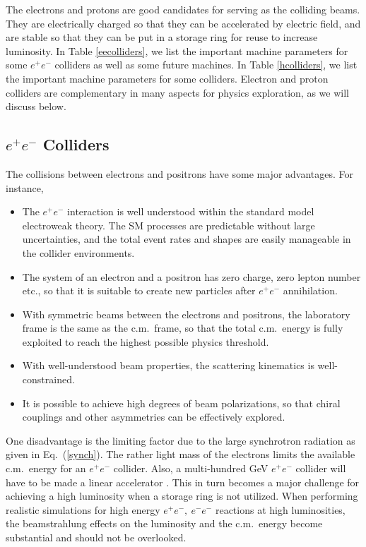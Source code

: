\documentclass[12pt,prd,aps,floats,preprintnumbers,preprint,superscriptaddress,floatfix,nofootinbib]{revtex4}
\def\epem{e^+e^-}
\begin{document}
The  electrons and protons are good candidates for serving
as the colliding beams. They are electrically charged so that they can be
accelerated by electric field, and are stable so that they can be put in a 
storage ring for reuse to increase luminosity. 
In Table \ref{eecolliders}, we list the important machine parameters for some
$\epem $ colliders as well as some future machines. 
In Table \ref{hcolliders}, we list the important machine parameters for some
colliders. Electron and proton colliders are complementary 
in many aspects for physics exploration, as we will discuss below. 
%

\subsection{$e^+e^-$ Colliders}

The collisions between electrons and  positrons  have some major  advantages. 
For instance,
%
\begin{itemize}
\item The $\epem$ interaction is well understood within the standard model
electroweak theory. The SM processes are predictable without large
uncertainties, and  the total event rates and shapes are easily manageable 
in the collider environments. 
\item The system of an electron and a  positron  has zero charge, zero lepton
number etc., so that it is suitable to create new particles after $\epem$
annihilation.
\item With symmetric beams between the electrons and positrons,  
the laboratory frame is the same as the c.m.~frame, 
so that the total c.m.~energy is fully exploited to reach the highest possible physics
threshold.
\item With well-understood beam properties, the scattering kinematics is 
well-constrained. 
\item It is possible to achieve high degrees of beam polarizations, so that chiral
couplings and other asymmetries can be effectively explored.
\end{itemize}

One disadvantage is the limiting factor due to the large synchrotron radiation
as given in Eq.~(\ref{synch}). The rather light mass of the electrons limits the
available c.m.~energy for an $\epem$ collider. Also, 
 a multi-hundred GeV $\epem$ collider will have to be made a linear 
accelerator \cite{ILC}. This in turn becomes a major 
challenge for achieving a high
luminosity when a storage ring is not utilized.
When performing realistic simulations for high energy $\epem,\ e^-e^-$
reactions at high luminosities, the beamstrahlung effects on the
luminosity and the c.m.~energy  become
substantial and should not be overlooked. 
\end{document}
